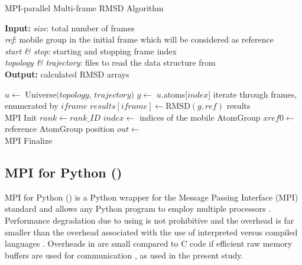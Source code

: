 \begin{algorithm}[ht]
	\scriptsize
	\caption{MPI-parallel Multi-frame RMSD Algorithm}
	\label{alg:RMSD}
	\hspace*{\algorithmicindent} \textbf{Input:} \emph{size}: total number of frames \\
	\hspace*{\algorithmicindent} \emph{ref}: mobile group in the initial frame which will be considered as reference \\
	\hspace*{\algorithmicindent} \emph{start \& stop}: starting and stopping frame index\\
	\hspace*{\algorithmicindent} \emph{topology \& trajectory}: files to read the data structure from \\
	\hspace*{\algorithmicindent} \textbf{Output:} calculated RMSD arrays
	\begin{algorithmic}[1]
		\State $u \gets$ Universe$(topology$, $trajectory)$
		\State $g \gets$ $u.$atoms[$index$]  
		 \Comment iterate through frames, enumerated by $iframe$
		\State $results[iframe] \gets \text{RMSD}(g, ref)$ 
		\EndFor
		\State \Return results
		\EndFunction
		\\        
		\State MPI Init
		\State $rank \gets rank\_ID$
		\State $index \gets$ indices of the mobile AtomGroup
		\State $xref0 \gets$ reference AtomGroup position
		\State $out \gets$ 
                \\
		\State {}
		\State MPI Finalize
	\end{algorithmic}
\end{algorithm}


\subsection{MPI for Python ()}
\label{sec:methods-mpi4py}

MPI for Python () is a Python wrapper for the Message Passing Interface (MPI) standard and allows any Python program to employ multiple processors \cite{Dalcin:2011aa, Dalcin:2005aa}.
Performance degradation due to using  is not prohibitive \cite{Dalcin:2011aa, Dalcin:2005aa} and the overhead is far smaller than the overhead associated with the use of interpreted versus compiled languages \cite{GAiN}.
Overheads in  are small compared to C code if efficient raw memory buffers are used for communication \cite{Dalcin:2011aa}, as used in the present study.


